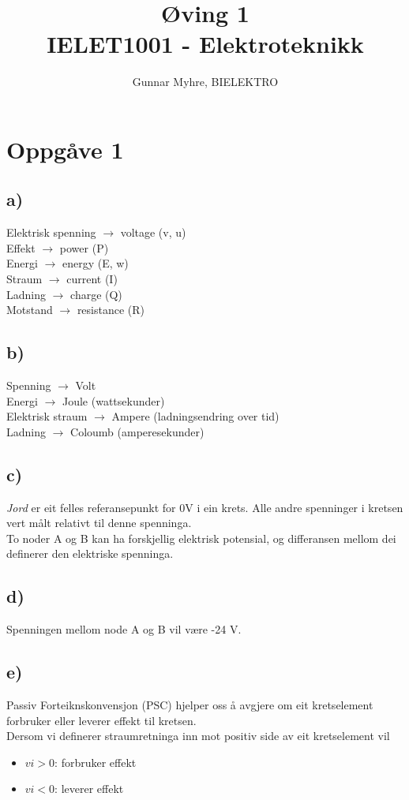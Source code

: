 \documentclass[12pt,a4paper]{article}
\title{%
	Øving 1 \\
	\large IELET1001 - Elektroteknikk \\
	}
\author{Gunnar Myhre, BIELEKTRO}
\begin{document}
	\maketitle
	
	\section{Oppgåve 1}
		\subsection{a)}
		Elektrisk spenning $\rightarrow$ voltage (v, u)\\
		Effekt $\rightarrow$ power (P) \\
		Energi $\rightarrow$ energy (E, w)\\
		Straum $\rightarrow$ current (I) \\
		Ladning $\rightarrow$ charge (Q) \\
		Motstand $\rightarrow$ resistance (R) \\

		\subsection{b)}
		Spenning $\rightarrow$ Volt \\
		Energi $\rightarrow$ Joule (wattsekunder) \\
		Elektrisk straum $\rightarrow$ Ampere (ladningsendring over tid) \\
		Ladning $\rightarrow$ Coloumb (amperesekunder) \\

		\subsection{c)}
		\textit{Jord} er eit felles referansepunkt for 0V i ein krets. Alle andre spenninger
		i kretsen vert målt relativt til denne spenninga. \\
		To noder A og B kan ha forskjellig elektrisk potensial, og differansen mellom dei
		definerer den elektriske spenninga.

		\subsection{d)}
		Spenningen mellom node A og B vil være -24 V.

		\subsection{e)}
		Passiv Forteiknskonvensjon (PSC) hjelper oss å avgjere om eit kretselement forbruker
		eller leverer effekt til kretsen. \\
		Dersom vi definerer straumretninga inn mot positiv side av eit kretselement vil
		\begin{itemize}
			\item $vi>0$: forbruker effekt
			\item $vi<0$: leverer effekt
		\end{itemize}
	
\end{document}

